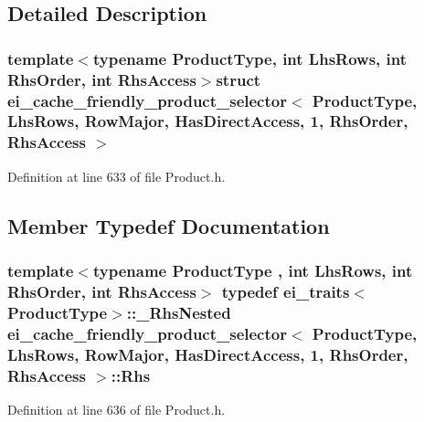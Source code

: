 \subsection{Detailed Description}
\subsubsection*{template$<$typename Product\-Type, int Lhs\-Rows, int Rhs\-Order, int Rhs\-Access$>$struct ei\-\_\-cache\-\_\-friendly\-\_\-product\-\_\-selector$<$ Product\-Type, Lhs\-Rows, Row\-Major, Has\-Direct\-Access, 1, Rhs\-Order, Rhs\-Access $>$}



Definition at line 633 of file Product.\-h.



\subsection{Member Typedef Documentation}
\hypertarget{structei__cache__friendly__product__selector_3_01_product_type_00_01_lhs_rows_00_01_row_major_0004e85d331a9d3202615416911b3c7cf8_a6b44cb0f3bb9987c7052a35bf9fd50b2}{
\subsubsection[{Rhs}]{\setlength{\rightskip}{0pt plus 5cm}template$<$typename Product\-Type , int Lhs\-Rows, int Rhs\-Order, int Rhs\-Access$>$ typedef {\bf ei\-\_\-traits}$<$Product\-Type$>$\-::\-\_\-\-Rhs\-Nested {\bf ei\-\_\-cache\-\_\-friendly\-\_\-product\-\_\-selector}$<$ Product\-Type, Lhs\-Rows, {\bf Row\-Major}, {\bf Has\-Direct\-Access}, 1, Rhs\-Order, Rhs\-Access $>$\-::{\bf Rhs}}}\label{structei__cache__friendly__product__selector_3_01_product_type_00_01_lhs_rows_00_01_row_major_0004e85d331a9d3202615416911b3c7cf8_a6b44cb0f3bb9987c7052a35bf9fd50b2}


Definition at line 636 of file Product.\-h.

